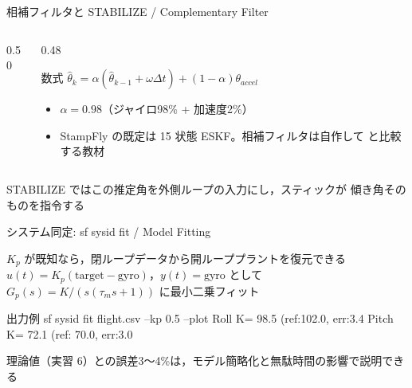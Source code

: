 \begin{frame}{相補フィルタと STABILIZE / Complementary Filter}
  \begin{columns}[c]
    \begin{column}{0.50\textwidth}
      \centering
      \resizebox{\linewidth}{!}{}
    \end{column}
    \begin{column}{0.48\textwidth}
      \begin{block}{数式}\footnotesize
        $\hat\theta_k = \alpha(\hat\theta_{k-1}+\omega\Delta t) + (1-\alpha)\theta_{accel}$
      \end{block}
      \vspace{0.3em}
      \begin{itemize}\small
        \item $\alpha=0.98$（ジャイロ98\% + 加速度2\%）
        \item StampFly の既定は 15 状態 ESKF。相補フィルタは自作して
               と比較する教材
      \end{itemize}
    \end{column}
  \end{columns}

  \vspace{0.3em}

  {\small STABILIZE ではこの推定角を外側ループの入力にし，スティックが
  傾き角そのものを指令する}
\end{frame}

\begin{frame}[fragile]{システム同定: sf sysid fit / Model Fitting}
  \begin{block}{$K_p$ が既知なら，閉ループデータから開ループプラントを復元できる}
    \footnotesize $u(t) = K_p(\text{target}-\text{gyro})$，$y(t)=\text{gyro}$ として
    $G_p(s)=K/(s(\tau_m s+1))$ に最小二乗フィット
  \end{block}

  \vspace{0.5em}

  \begin{sflisting}[basicstyle=\ttfamily\scriptsize]{出力例}
sf sysid fit flight.csv --kp 0.5 --plot
  Roll  K= 98.5 (ref:102.0, err:3.4%
  Pitch K= 72.1 (ref: 70.0, err:3.0%
  \end{sflisting}

  {\small 理論値（実習 6）との誤差3〜4\%は，モデル簡略化と無駄時間の影響で説明できる}
\end{frame}

